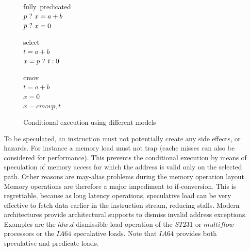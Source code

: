 \begin{figure}
\footnotesize
\begin{minipage}[t]{3cm}
\mbox{fully predicated} \\
$p ~?~ x = a + b $ \\
$\overline{p} ~?~ x = 0 $ \\
\end{minipage} 
\begin{minipage}[t]{3cm}
\mbox{select} \\
$t = a + b $ \\
$x= p ~?~ t : 0 $ \\
\end{minipage}
\begin{minipage}[t]{3cm}
\mbox{cmov} \\
$t = a + b $ \\
$x = 0 $ \\
$x = cmov p,t$ \\
\end{minipage}
\caption{Conditional execution using different models}
\label{fig:pred}
\end{figure}

To be speculated, an instruction must not potentially create any side effects, or hazards. For instance a memory load must not trap (cache misses can also be considered for performance). This prevents the conditional execution by means of speculation of memory access for which the address is valid only on the selected path. Other reasons are may-alias problems during the memory operation layout. Memory operations are therefore a major impediment to if-conversion. This is regrettable, because as long latency operations, speculative load can be very effective to fetch data earlier in the instruction stream, reducing stalls. Modern architectures provide architectural supports to dismiss invalid address exceptions. Examples are the $ldw.d$ dismissible load operation of the $ST231$ or $multiflow$ processors or the $IA64$ speculative loads. Note that $IA64$ provides both speculative and predicate loads.

